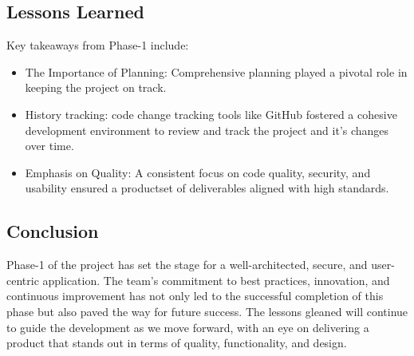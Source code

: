 \documentclass[11pt]{article}
\begin{document}
\subsection{Lessons Learned}
\label{sec:org483978b}
Key takeaways from Phase-1 include:

\begin{itemize}
\item The Importance of Planning: Comprehensive planning played a pivotal role
in keeping the project on track.

\item History tracking: code change tracking tools like GitHub fostered a
cohesive development environment to review and track the project and it's
changes over time.

\item Emphasis on Quality: A consistent focus on code quality, security, and
usability ensured a productset of deliverables aligned with high standards.
\end{itemize}


\subsection{Conclusion}
\label{sec:orgb749078}

Phase-1 of the project has set the stage for a well-architected, secure, and
user-centric application. The team's commitment to best practices, innovation,
and continuous improvement has not only led to the successful completion of this
phase but also paved the way for future success. The lessons gleaned will
continue to guide the development as we move forward, with an eye on delivering
a product that stands out in terms of quality, functionality, and design.
\end{document}
